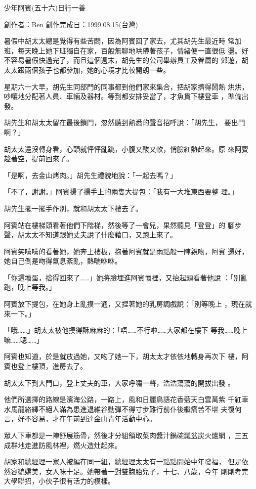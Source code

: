 



少年阿賓(五十六)日行一善

創作者：Ben
創作完成日：1999.08.15(台灣)

暑假中胡太太總是覺得有些苦悶，因為阿賓回了家去，尤其胡先生最近時
常加班，每天晚上她下班獨自在家，百般無聊地哄帶著孩子，情緒便一直很低
盪。好不容易暑假快過完了，而且這個週末，胡先生的公司舉辦員工及眷屬的
郊遊，胡太太跟兩個孩子也都參加，她的心境才比較開朗一些。

星期六一大早，胡先生同部門的同事都到他們家來集合，把胡家擠得鬧熱
烘烘，吵嚷地分配著人員、車輛及器材。等到都安排妥當了，才魚貫下樓登車
，準備出發。

胡先生和胡太太留在最後鎖門，忽然聽到熟悉的聲音招呼說：「胡先生，
要出門啊？」

胡太太還沒轉身看，心頭就怦怦亂跳，小腹又酸又軟，俏臉紅熱起來。原
來阿賓趁著空，提前回來了。

「是啊，去金山烤肉。」胡先生禮貌地說：「一起去嗎？」

「不了，謝謝。」阿賓揚了揚手上的兩隻大提包：「我有一大堆東西要整
理。」

胡先生擺一擺手作別，就和胡太太下樓去了。

阿賓站在樓梯頭看著他們下階梯，然後等了一會兒，果然聽見「登登」的
腳步聲，胡太太不知道跟她丈夫說了什麼藉口，又跑上來了。

阿賓笑嘻嘻的看著她，她奔上樓板，抱著阿賓就是雨點般一陣親吻，阿賓
還好，她自己倒是吻得氣息紊亂，熱喘咻咻。

「你這壞蛋，捨得回來了……」她將臉埋進阿賓懷裡，又抬起頭看著他說
：「別亂跑，晚上等我。」

阿賓放下提包，在她身上亂摸一通，又捏著她的乳房調戲說：「別等晚上
，現在就來一下。」

「哦……」胡太太被他摸得酥麻麻的：「唔……不行啦……大家都在樓下
等我……晚上嘛……嗯……」

阿賓也知道，於是就放過她，又吻了她一下，胡太太才依依地轉身再次下
樓，阿賓也登上樓頂，進房去了。

胡太太下到大門口，登上丈夫的車，大家呼嘯一聲，浩浩蕩蕩的開拔出發
。

他們所選擇的路線是濱海公路，一路上，風和日麗鳥語花香藍天白雲萬紫
千紅車水馬龍絡繹不絕人滿為患進退維谷動彈不得寸步難行前仆後繼痛苦不堪
夫復何言，好不容易，才在午前到達金山青年活動中心。

眾人下車都是一陣舒展筋骨，然後才分組領取菜肉醬汁鍋碗瓢盆炭火爐網
，三五成群地走進防風林裡，燃火造灶起來。

胡家和總經理一家人被編在同一組，總經理太太有一點點開始中年發福，
但是依然容貌嬌美，女人味十足。她帶著一對雙胞胎兒子，十七、八歲，今年
剛剛考完大學聯招，小伙子很有活力的模樣。

